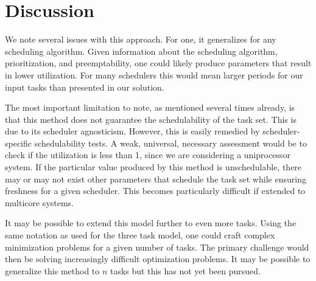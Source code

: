 \section{Discussion}

We note several issues with this approach. For one, it generalizes for any scheduling algorithm. Given information about the scheduling algorithm, prioritization, and preemptability, one could likely produce parameters that result in lower utilization. For many schedulers this would mean larger periods for our input tasks than presented in our solution.

The most important limitation to note, as mentioned several times already, is that this method does not guarantee the schedulability of the task set. This is due to its scheduler agnosticism. However, this is easily remedied by scheduler-specific schedulability tests. A weak, universal, necessary assessment would be to check if the utilization is less than 1, since we are considering a uniprocessor system. If the particular value produced by this method is unschedulable, there may or may not exist other parameters that schedule the task set while ensuring freshness for a given scheduler. This becomes particularly difficult if extended to multicore systems.

It may be possible to extend this model further to even more tasks. Using the same notation as used for the three task model, one could craft complex minimization problems for a given number of tasks. The primary challenge would then be solving increasingly difficult optimization problems. It may be possible to generalize this method to $n$ tasks but this has not yet been pursued.
